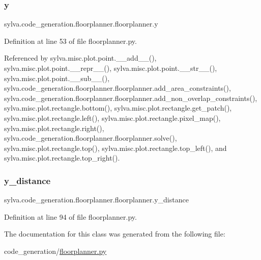 \subsubsection{\texorpdfstring{y}{y}}
{\footnotesize\ttfamily sylva.\+code\+\_\+generation.\+floorplanner.\+floorplanner.\+y}



Definition at line 53 of file floorplanner.\+py.



Referenced by sylva.\+misc.\+plot.\+point.\+\_\+\+\_\+add\+\_\+\+\_\+(), sylva.\+misc.\+plot.\+point.\+\_\+\+\_\+repr\+\_\+\+\_\+(), sylva.\+misc.\+plot.\+point.\+\_\+\+\_\+str\+\_\+\+\_\+(), sylva.\+misc.\+plot.\+point.\+\_\+\+\_\+sub\+\_\+\+\_\+(), sylva.\+code\+\_\+generation.\+floorplanner.\+floorplanner.\+add\+\_\+area\+\_\+constraints(), sylva.\+code\+\_\+generation.\+floorplanner.\+floorplanner.\+add\+\_\+non\+\_\+overlap\+\_\+constraints(), sylva.\+misc.\+plot.\+rectangle.\+bottom(), sylva.\+misc.\+plot.\+rectangle.\+get\+\_\+patch(), sylva.\+misc.\+plot.\+rectangle.\+left(), sylva.\+misc.\+plot.\+rectangle.\+pixel\+\_\+map(), sylva.\+misc.\+plot.\+rectangle.\+right(), sylva.\+code\+\_\+generation.\+floorplanner.\+floorplanner.\+solve(), sylva.\+misc.\+plot.\+rectangle.\+top(), sylva.\+misc.\+plot.\+rectangle.\+top\+\_\+left(), and sylva.\+misc.\+plot.\+rectangle.\+top\+\_\+right().

\mbox{\label{classsylva_1_1code__generation_1_1floorplanner_1_1floorplanner_abf433d1b5543d12d04aba987eac72755}} 
\subsubsection{\texorpdfstring{y\+\_\+distance}{y\_distance}}
{\footnotesize\ttfamily sylva.\+code\+\_\+generation.\+floorplanner.\+floorplanner.\+y\+\_\+distance}



Definition at line 94 of file floorplanner.\+py.



The documentation for this class was generated from the following file\+:\begin{DoxyCompactItemize}
\item 
code\+\_\+generation/\hyperlink{floorplanner_8py}{floorplanner.\+py}\end{DoxyCompactItemize}
